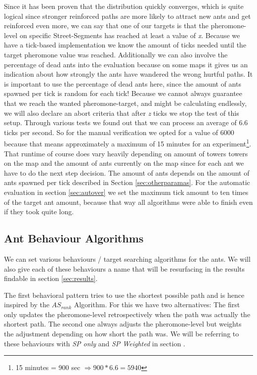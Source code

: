 Since it has been proven that the distribution quickly converges\cite[P. 15]{maniezzo2002ant}, which is quite logical since stronger reinforced paths are more likely to attract new ants and get reinforced even more, we can say that one of our targets is that the pheromone-level on specific Street-Segments has reached at least a value of \textit{x}.
Because we have a tick-based implementation we know the amount of ticks needed until the target pheromone value was reached. Additionally we can also involve the percentage of dead ants into the evaluation because on some maps it gives us an indication about how strongly the ants have wandered  the wrong hurtful paths. It is important to use the percentage of dead ants here, since the amount of ants spawned per tick is random for each tick!
Because we cannot always guarantee that we reach the wanted pheromone-target, and might be calculating endlessly, we will also declare an abort criteria that after \textit{z} ticks we stop the test of this setup. Through various tests we found out that we can process an average of 6.6 ticks per second. So for the manual verification we opted for a value of 6000 because that means approximately a maximum of 15 minutes for an experiment\footnote{15 minutes = 900 sec  $\Rightarrow 900 * 6.6 = 5940$}. That runtime of course does vary heavily depending on amount of towers towers on the map and the amount of ants currently on the map since for each ant we have to do the next step decision. The amount of ants depends on the amount of ants spawned per tick described in Section \ref{sec:otherparamas}.
For the automatic evaluation in section \ref{sec:autover} we set the maximum tick amount to ten times of the target ant amount, because that way all algorithms were able to finish even if they took quite long. 


\subsection{Ant Behaviour Algorithms}
\label{sec:behaviour}
We can set various behaviours / target searching algorithms for the ants. We will also give each of these behaviours a name that will be resurfacing in the results findable in section \ref{sec:results}.

The first behavioral pattern tries to use the shortest possible path and is hence inspired by the $AS_{rank}$ Algorithm\cite{zecchin2007ant}.
For this we have two alternatives: The first only updates the pheromone-level retrospectively when the path was actually the shortest path. The second one always adjusts the pheromone-level but weights the adjustment depending on how short the path was.
We will be referring to these behaviours with \textit{SP only} and \textit{SP Weighted} in section .

